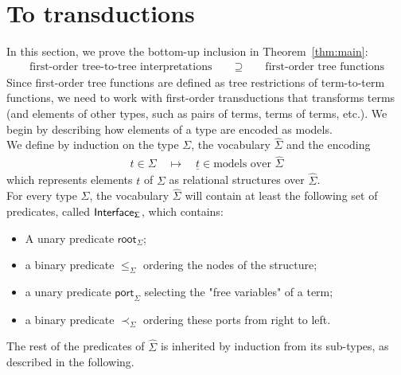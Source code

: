 \newcommand{\Root}[1]{\mathsf{root}_{#1}}
\newcommand{\Port}[1]{\mathsf{port}_{#1}}
\newcommand{\Interface}[1]{\mathsf{Interface}_{#1}}
\section{To transductions}
\label{sec:to-transductions}
In this section, we prove the bottom-up inclusion in Theorem~\ref{thm:main}:
\begin{align*}
    \text{first-order tree-to-tree interpretations} \qquad \supseteq \qquad \text{first-order tree functions}
\end{align*}
Since first-order tree functions are defined as tree restrictions of term-to-term functions, we need to work with first-order transductions that transforms terms (and elements of other types, such as pairs of terms, terms of terms, etc.). We begin by describing how elements of a type are encoded as models. 
\\

We define by induction on the type $\Sigma$, the vocabulary $\hat \Sigma$ and the encoding 
 \begin{align*}
     t \in \Sigma \quad \mapsto \quad \underline t \in \text{models over $\hat \Sigma$}
 \end{align*}
 which represents elements $t$ of $\Sigma$ as relational structures over $\hat \Sigma$.
 \\
 
 For every type $\Sigma$, the vocabulary $\hat \Sigma$ will contain at least the following set of predicates, called $\sf{Interface}_\Sigma$, which contains:
 \begin{itemize}
 \item A unary predicate $\Root{\Sigma}$;
 \item a binary predicate $\leq_\Sigma$ ordering the nodes of the structure;
  \item a unary predicate $\Port{\Sigma}$ selecting the "free variables" of a term; 
 \item a binary predicate $\prec_\Sigma$ ordering these ports from right to left.  
\end{itemize}  

The rest of the predicates of $\hat \Sigma$ is inherited by induction from its sub-types, as described in the following.\\

